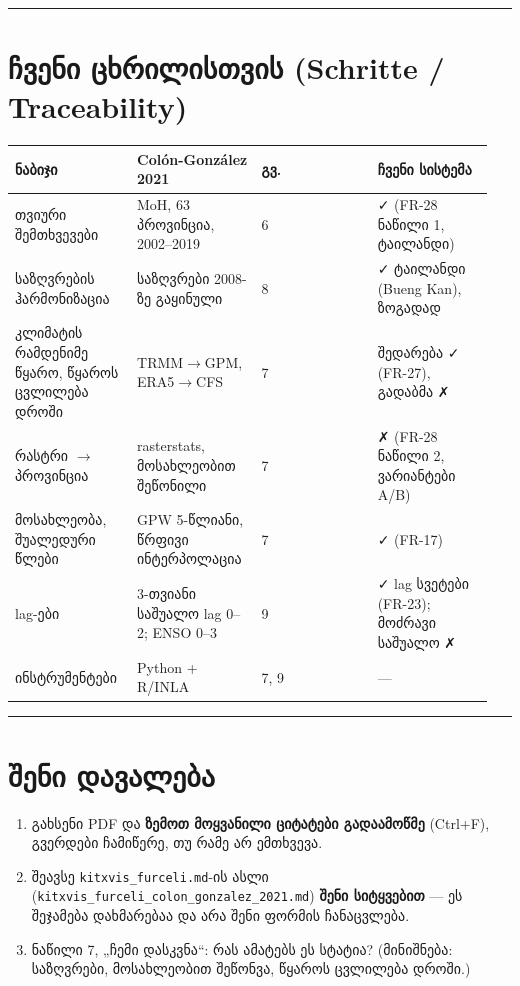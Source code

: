 \documentclass[11pt,a4paper]{article}
\begin{document}
\medskip\hrule\medskip

\section*{ჩვენი ცხრილისთვის (Schritte / Traceability)}

\begin{longtable}{@{}p{0.237\linewidth}p{0.237\linewidth}p{0.237\linewidth}p{0.237\linewidth}@{}}
\toprule
\textbf{ნაბიჯი} & \textbf{Colón-González 2021} & \textbf{გვ.} & \textbf{ჩვენი სისტემა} \\
\midrule
თვიური შემთხვევები & MoH, 63 პროვინცია, 2002–2019 & 6 & {\symfont ✓} (FR-28 ნაწილი 1, ტაილანდი) \\
საზღვრების ჰარმონიზაცია & საზღვრები 2008-ზე გაყინული & 8 & {\symfont ✓} ტაილანდი (Bueng Kan), {\symfont {\symfont ⚠}} ზოგადად \\
კლიმატის რამდენიმე წყარო, წყაროს ცვლილება დროში & TRMM$\rightarrow$GPM, ERA5$\rightarrow$CFS & 7 & {\symfont {\symfont ⚠}} შედარება {\symfont ✓} (FR-27), გადაბმა {\symfont ✗} \\
რასტრი $\rightarrow$ პროვინცია & rasterstats, მოსახლეობით შეწონილი & 7 & {\symfont ✗} (FR-28 ნაწილი 2, ვარიანტები A/B) \\
მოსახლეობა, შუალედური წლები & GPW 5-წლიანი, წრფივი ინტერპოლაცია & 7 & {\symfont ✓} (FR-17) \\
lag-ები & 3-თვიანი საშუალო lag 0–2; ENSO 0–3 & 9 & {\symfont ✓} lag სვეტები (FR-23); მოძრავი საშუალო {\symfont ✗} \\
ინსტრუმენტები & Python + R/INLA & 7, 9 & — \\
\bottomrule
\end{longtable}

\medskip\hrule\medskip

\section*{შენი დავალება}
\begin{enumerate}[nosep]
\item გახსენი PDF და \textbf{ზემოთ მოყვანილი ციტატები გადაამოწმე} (Ctrl+F), გვერდები ჩამიწერე, თუ რამე არ ემთხვევა.
\item შეავსე \texttt{kitxvis\_furceli.md}-ის ასლი (\texttt{kitxvis\_furceli\_colon\_gonzalez\_2021.md}) \textbf{შენი სიტყვებით} — ეს
შეჯამება დახმარებაა და არა შენი ფორმის ჩანაცვლება.
\item ნაწილი 7, „ჩემი დასკვნა“: რას ამატებს ეს სტატია? (მინიშნება: საზღვრები, მოსახლეობით შეწონვა, წყაროს ცვლილება დროში.)
\end{enumerate}
\end{document}
